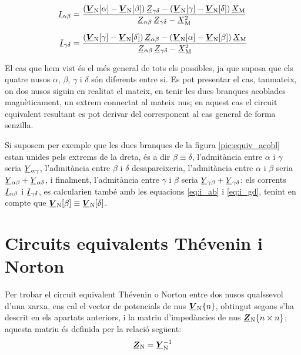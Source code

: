 \begin{subequations}
\begin{align}
    \cmplx{I}_{\alpha\beta} &=  \frac{(\mcmplx{V}\ped{N}[\alpha] - \mcmplx{V}\ped{N}[\beta]) \, \cmplx{Z}_{\gamma\delta} - (\mcmplx{V}\ped{N}[\gamma] - \mcmplx{V}\ped{N}[\delta]) \,
    \cmplx{X}\ped{M}}{\cmplx{Z}_{\alpha\beta}\,
    \cmplx{Z}_{\gamma\delta}-\cmplx{X}\ped{M}^2} \label{eq:i_ab}
    \\[1.5ex]
    \cmplx{I}_{\gamma\delta} &= \frac{(\mcmplx{V}\ped{N}[\gamma] - \mcmplx{V}\ped{N}[\delta]) \, \cmplx{Z}_{\alpha\beta} - (\mcmplx{V}\ped{N}[\alpha] - \mcmplx{V}\ped{N}[\beta]) \,
    \cmplx{X}\ped{M}}{\cmplx{Z}_{\alpha\beta}\,
    \cmplx{Z}_{\gamma\delta}-\cmplx{X}\ped{M}^2} \label{eq:i_gd}
\end{align}
\end{subequations}

El cas que hem vist  és el més general de tots els
possibles, ja que suposa que els quatre nusos $\alpha$, $\beta$,
$\gamma$ i $\delta$ són diferents entre si. Es pot presentar el cas,
tanmateix, on dos nusos siguin en realitat el mateix, en tenir les
dues branques acoblades magnèticament, un extrem connectat al mateix
nus; en aquest cas el circuit equivalent resultant es pot derivar
del corresponent al cas general de forma senzilla.

Si suposem per exemple que les dues branques de la figura
\vref{pic:equiv_acobl} estan unides pels extrems de la dreta,
és a dir $\beta\equiv\delta$, l'admitància entre
$\alpha$ i $\gamma$ seria $\cmplx{Y}_{\alpha\gamma}$, l'admitància
entre $\beta$ i $\delta$ desapareixeria, l'admitància entre $\alpha$
i $\beta$ seria $\cmplx{Y}_{\alpha\beta} +
\cmplx{Y}_{\alpha\delta}$, i finalment, l'admitància entre $\gamma$
i $\beta$ seria $\cmplx{Y}_{\gamma\beta} +
\cmplx{Y}_{\gamma\delta}$; els corrents $\cmplx{I}_{\alpha\beta}$ i
$\cmplx{I}_{\gamma\delta}$, es calcularien també amb les equacions
\eqref{eq:i_ab} i \eqref{eq:i_gd}, tenint en compte que
$\mcmplx{V}\ped{N}[\beta]\equiv\mcmplx{V}\ped{N}[\delta]$.

\section{Circuits equivalents Thévenin i Norton}   \label{sec:xarxes_Zth}

Per trobar el
circuit equivalent Thévenin o Norton entre dos nusos qualssevol
d'una xarxa, ens cal el vector de potencials de nus
$\mcmplx{V}\ped{N}\{n\}$, obtingut segons s'ha descrit en els
apartats anteriors, i la matriu d'impedàncies de nus
$\mcmplx{Z}\ped{N}\{n\times n\}$; aquesta matriu és definida per
la relació següent:
\begin{equation}
   \mcmplx{Z}\ped{N} = \mcmplx{Y}\ped{N}^{-1}
\end{equation}

